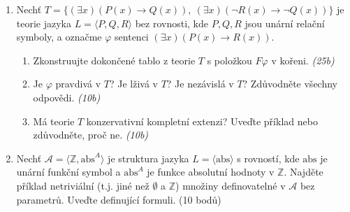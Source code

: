 \documentclass[a4paper]{article}
\begin{document}
\begin{enumerate}
\smallskip

\item Nechť $T=\{(\exists x)(P(x)\to Q(x)),\ (\exists x)(\neg R(x)\to \neg Q(x))\}$ je teorie jazyka $L=\langle P,Q,R\rangle$ bez rovnosti, kde $P,Q,R$ jsou unární relační symboly, a označme $\varphi$ sentenci $(\exists x)(P(x) \to R(x))$.
\begin{enumerate}
    \item Zkonstruujte dokončené tablo z teorie $T$ s položkou $F\varphi$ v kořeni. {\it (25b)}
    \item Je $\varphi$ pravdivá v $T$? Je lživá v $T$? Je nezávislá v $T$? Zdůvodněte všechny odpovědi. {\it (10b)}
    \item Má teorie $T$ konzervativní kompletní extenzi? Uveďte příklad nebo zdůvodněte, proč ne. {\it (10b)}
\end{enumerate}

\smallskip

\item Nechť $\mathcal{A}=\langle\mathbb{Z},\mathrm{abs}^A \rangle$ je struktura jazyka $L=\langle \mathrm{abs} \rangle$ s rovností, kde $\mathrm{abs}$ je unární funkční symbol a $\mathrm{abs}^A$ je funkce absolutní hodnoty v $\mathbb{Z}$. Najděte příklad netriviální (t.j. jiné než $\emptyset$ a $\mathbb{Z}$) množiny definovatelné v $\mathcal{A}$ bez parametrů. Uveďte definující formuli. (10 bodů)
\end{enumerate}
\end{document}
